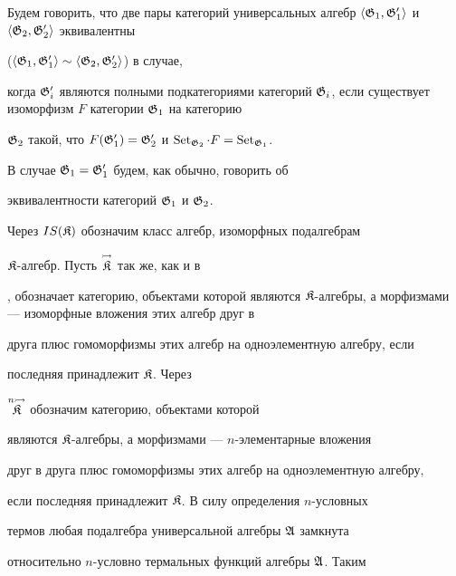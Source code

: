 \begin{defn} 


Будем говорить, что две пары категорий универсальных алгебр $\la\frak 


G_1,\frak G'_1\ra$ и $\la\frak G_2,\frak G'_2\ra$ эквивалентны 


($\langle\frak G_1,\frak G'_1\rangle\sim\langle\frak G_2,\frak G_2'\rangle$) в случае, 


когда $\frak G'_i$ являются полными подкатегориями категорий $\frak 


G_i$, если существует изоморфизм $F$ категории $\frak G_1$ на категорию 


$\frak G_2$ такой, что $F(\frak G'_1)=\frak G'_2$ и $\Set_{\frak 


G_2}\cdot F=\Set_{\frak G_1}$. 


 


В случае $\frak G_1=\frak G'_1$ будем, как обычно, говорить об 


эквивалентности категорий $\frak G_1$ и $\frak G_2$. 


\end{defn} 


 


Через $IS(\frak K)$ обозначим класс алгебр, изоморфных подалгебрам 


$\frak K$-алгебр. Пусть $\overset{\rightarrowtail}{\frak K}{}$ так же, как и в 


\cite{2}, обозначает категорию, объектами которой являются $\frak 


K$-алгебры, а морфизмами --- изоморфные вложения этих алгебр друг в 


друга плюс гомоморфизмы этих алгебр на одноэлементную алгебру, если 


последняя принадлежит $\frak K$. Через 


$\overset{n\rightarrowtail}{\frak K}{}$ обозначим категорию, объектами которой 


являются $\frak K$-алгебры, а морфизмами --- $n$-элементарные вложения 


друг в друга плюс гомоморфизмы этих алгебр на одноэлементную алгебру, 


если последняя принадлежит $\frak K$. В силу определения $n$-условных 


термов любая подалгебра универсальной алгебры $\frak A$ замкнута 


относительно $n$-условно термальных функций алгебры $\frak A$. Таким 


